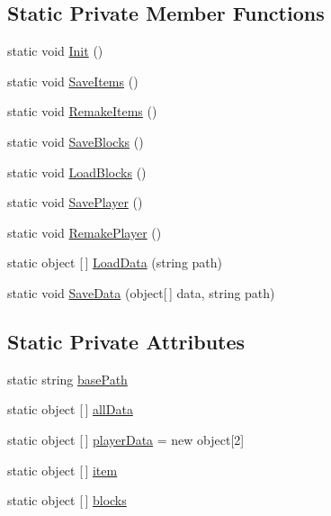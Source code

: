 \subsection*{Static Private Member Functions}
\begin{DoxyCompactItemize}
\item 
static void \hyperlink{class_bee_game_1_1_serialization_1_1_serialization_afefd28e9eab4d1ce6c61ed03b724902d}{Init} ()
\item 
static void \hyperlink{class_bee_game_1_1_serialization_1_1_serialization_a6eef4285def16ce7c5ce67b487e03dd1}{Save\+Items} ()
\item 
static void \hyperlink{class_bee_game_1_1_serialization_1_1_serialization_af06c3b4c0c2baa92fce21403e4fc5372}{Remake\+Items} ()
\item 
static void \hyperlink{class_bee_game_1_1_serialization_1_1_serialization_af90f749946423cc375c37bd7d496691a}{Save\+Blocks} ()
\item 
static void \hyperlink{class_bee_game_1_1_serialization_1_1_serialization_a3641370fc2ffea0db839cf7faf6c3efb}{Load\+Blocks} ()
\item 
static void \hyperlink{class_bee_game_1_1_serialization_1_1_serialization_a86c4e702114f2f6fdf2dd55517d8e691}{Save\+Player} ()
\item 
static void \hyperlink{class_bee_game_1_1_serialization_1_1_serialization_ac2d321fdd05f08085eefcb8f62c6baf0}{Remake\+Player} ()
\item 
static object \mbox{[}$\,$\mbox{]} \hyperlink{class_bee_game_1_1_serialization_1_1_serialization_a733a85a3fd7cb1194269464a71926959}{Load\+Data} (string path)
\item 
static void \hyperlink{class_bee_game_1_1_serialization_1_1_serialization_a5e84293340234b478d4ef6bd8168260f}{Save\+Data} (object\mbox{[}$\,$\mbox{]} data, string path)
\end{DoxyCompactItemize}
\subsection*{Static Private Attributes}
\begin{DoxyCompactItemize}
\item 
static string \hyperlink{class_bee_game_1_1_serialization_1_1_serialization_ab90922fcf58a723ce591487507356310}{base\+Path}
\item 
static object \mbox{[}$\,$\mbox{]} \hyperlink{class_bee_game_1_1_serialization_1_1_serialization_ad79bc6234bf57644744e131bfc1c164d}{all\+Data}
\item 
static object \mbox{[}$\,$\mbox{]} \hyperlink{class_bee_game_1_1_serialization_1_1_serialization_a4c53353a34466434389b58c351edf08d}{player\+Data} = new object\mbox{[}2\mbox{]}
\item 
static object \mbox{[}$\,$\mbox{]} \hyperlink{class_bee_game_1_1_serialization_1_1_serialization_af3359d6ca7e84c9e52a790beb1cc502e}{item}
\item 
static object \mbox{[}$\,$\mbox{]} \hyperlink{class_bee_game_1_1_serialization_1_1_serialization_a0b8dee0f221f22b34bb3de8c146b4d0d}{blocks}
\end{DoxyCompactItemize}


